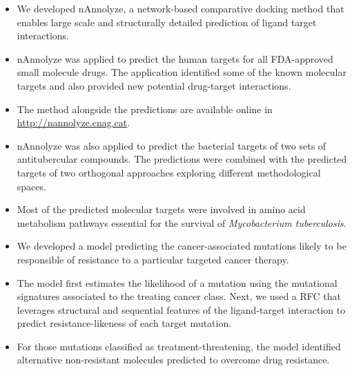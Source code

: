 \documentclass[11pt, b5paper,twoside]{tesi_upf}
\begin{document}
 
\begin{itemize}

\item We developed nAnnolyze, a network-based comparative docking method that enables  large scale and structurally detailed prediction of ligand target interactions. 

\item nAnnolyze was applied to predict the human targets for all FDA-approved small molecule drugs. The application identified some of the known molecular targets and also provided new potential drug-target interactions. 

\item The method alongside the predictions are available online in \url{http://nannolyze.cnag.cat}.  

\item nAnnolyze was also applied to predict the bacterial targets of two sets of antitubercular compounds.  The predictions were combined with the predicted targets of two orthogonal approaches exploring different methodological spaces. 

\item Most of the predicted molecular targets were involved in amino acid metabolism pathways essential for the survival of \textit{Mycobacterium tuberculosis}.   
 
\item We developed a model predicting the cancer-associated mutations likely to be responsible of resistance to a  particular targeted cancer therapy. 

\item The model first estimates the likelihood of a mutation using the mutational signatures associated to the treating cancer class. Next, we used a RFC that leverages structural and sequential features of the ligand-target interaction to predict resistance-likeness of each target mutation.  

\item For those mutations classified as treatment-threatening, the model identified alternative non-resistant molecules predicted to overcome drug resistance.


\end{itemize}
 
 
 
 
 
 


%



\backmatter
\printindex

\printbibliography
\end{document}
